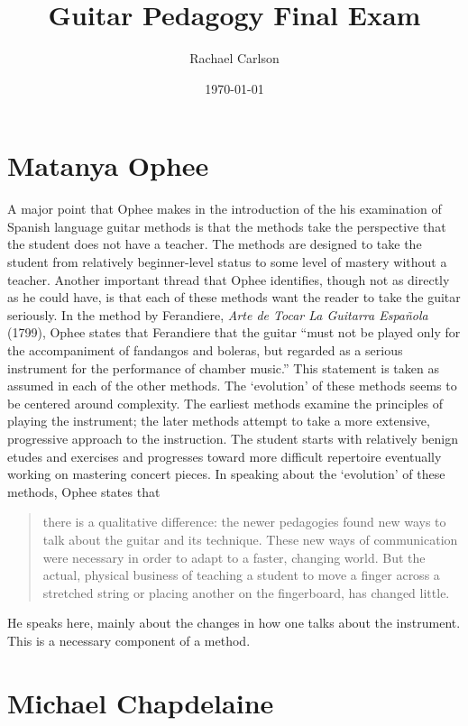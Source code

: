 \documentclass[12pt]{article}
\author{Rachael Carlson}
\title{Guitar Pedagogy Final Exam}
\date{\today}
\begin{document}
\maketitle

\section{Matanya Ophee}
\label{sec:question-1}

A major point that Ophee makes in the introduction of the his
examination of Spanish language guitar methods is that the methods
take the perspective that the student does not have a teacher. The
methods are designed to take the student from relatively
beginner-level status to some level of mastery without a
teacher. Another important thread that Ophee identifies, though not as
directly as he could have, is that each of these methods want the
reader to take the guitar seriously. In the method by Ferandiere,
\emph{Arte de Tocar La Guitarra Española} (1799), Ophee states that
Ferandiere that the guitar ``must not be played only for the
accompaniment of fandangos and boleras, but regarded as a serious
instrument for the performance of chamber music.'' This statement is
taken as assumed in each of the other methods. The `evolution' of
these methods seems to be centered around complexity. The earliest
methods examine the principles of playing the instrument; the later
methods attempt to take a more extensive, progressive approach to the
instruction. The student starts with relatively benign etudes and
exercises and progresses toward more difficult repertoire eventually
working on mastering concert pieces. In speaking about the `evolution'
of these methods, Ophee states that
\begin{quote}
  there is a qualitative difference: the newer pedagogies found new
  ways to talk about the guitar and its technique. These new ways of
  communication were necessary in order to adapt to a faster, changing
  world. But the actual, physical business of teaching a student to
  move a finger across a stretched string or placing another on the
  fingerboard, has changed little.
\end{quote}
He speaks here, mainly about the changes in how one talks about the
instrument. This is a necessary component of a method.

\section{Michael Chapdelaine}
\label{sec:michael-chapdelaine}
\end{document}
